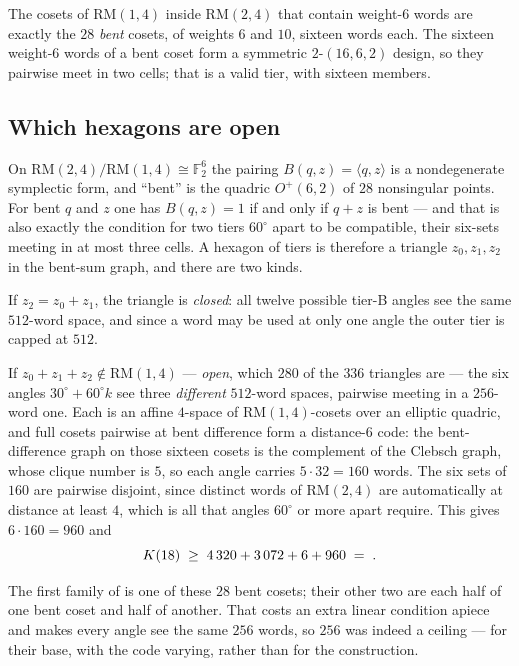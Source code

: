 \documentclass[11pt]{amsart}
\theoremstyle{remark}
\newcommand{\ip}[2]{\langle #1,#2\rangle}
\begin{document}
The cosets of $\mathrm{RM}(1,4)$ inside $\mathrm{RM}(2,4)$ that contain weight-$6$
words are exactly the $28$ \emph{bent} cosets, of weights $6$ and $10$, sixteen
words each. The sixteen weight-$6$ words of a bent coset form a symmetric
$2$-$(16,6,2)$ design, so they pairwise meet in two cells; that is a valid tier,
with sixteen members.

\subsection{Which hexagons are open}

On $\mathrm{RM}(2,4)/\mathrm{RM}(1,4)\cong\mathbb F_2^{6}$ the pairing
$B(q,z)=\ip{q}{z}$ is a nondegenerate symplectic form, and ``bent'' is the
quadric $O^{+}(6,2)$ of $28$ nonsingular points. For bent $q$ and $z$ one has
$B(q,z)=1$ if and only if $q+z$ is bent --- and that is also exactly the condition
for two tiers $60^\circ$ apart to be compatible, their six-sets meeting in at
most three cells. A hexagon of tiers is therefore a triangle $z_0,z_1,z_2$ in the
bent-sum graph, and there are two kinds.

If $z_2=z_0+z_1$, the triangle is \emph{closed}: all twelve possible tier-B
angles see the same $512$-word space, and since a word may be used at only one
angle the outer tier is capped at $512$.

If $z_0+z_1+z_2\notin\mathrm{RM}(1,4)$ --- \emph{open}, which $280$ of the $336$
triangles are --- the six angles $30^\circ+60^\circ k$ see three \emph{different}
$512$-word spaces, pairwise meeting in a $256$-word one. Each is an affine
$4$-space of $\mathrm{RM}(1,4)$-cosets over an elliptic quadric, and full cosets
pairwise at bent difference form a distance-$6$ code: the bent-difference graph on
those sixteen cosets is the complement of the Clebsch graph, whose clique number
is $5$, so each angle carries $5\cdot32=160$ words. The six sets of $160$ are
pairwise disjoint, since distinct words of $\mathrm{RM}(2,4)$ are automatically at
distance at least $4$, which is all that angles $60^\circ$ or more apart require.
This gives $6\cdot160=960$ and
\[
  K(18)\;\ge\;4\,320+3\,072+6+960\;=\;\Kh{18}.
\]

The first family of \cite{cohn-li2024} is one of these $28$ bent cosets; their
other two are each half of one bent coset and half of another. That costs an extra
linear condition apiece and makes every angle see the same $256$ words, so $256$
was indeed a ceiling --- for their base, with the code varying, rather than for the
construction.
\end{document}

